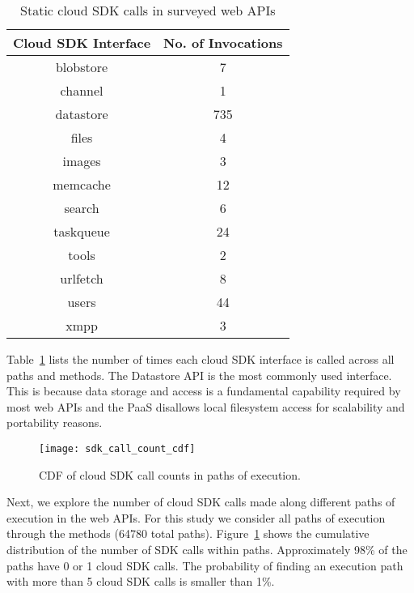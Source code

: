\begin{table}[htdp]
\caption{Static cloud SDK calls in surveyed web APIs
\label{tab:sdk_call_counts}
}
\begin{center}
\begin{tabular}{|c|c|}
\hline
Cloud SDK Interface & No. of Invocations \\ \hline
blobstore & 7 \\ \hline
channel & 1 \\ \hline
datastore & 735 \\ \hline
files & 4 \\ \hline
images & 3 \\ \hline
memcache & 12 \\ \hline
search & 6 \\ \hline
taskqueue & 24 \\ \hline
tools & 2 \\ \hline
urlfetch & 8 \\ \hline
users & 44 \\ \hline
xmpp & 3 \\ \hline
\end{tabular}
\end{center}
\vspace{-0.2in}
\end{table}

Table~\ref{tab:sdk_call_counts} lists the number of times each cloud 
SDK interface is called across all paths and methods.
The Datastore API is the most commonly used interface.
This is because data storage and access is a fundamental 
capability required by most web APIs and the PaaS
disallows local filesystem
access for scalability and portability reasons.

\begin{figure}
\centering
\texttt{[image: sdk\_call\_count\_cdf]}
\caption{CDF of cloud SDK call counts in paths of execution.
\label{fig:sdk_call_count_cdf}
}
\vspace{-0.2in}
\end{figure}

Next, we explore the number of cloud SDK calls made along 
different paths of execution in the web APIs. For this study
we consider all paths of execution through the methods (64780 total paths). 
Figure~\ref{fig:sdk_call_count_cdf}
shows the cumulative distribution of the number of SDK calls within paths.
Approximately 98\% of the paths have 0 or 1 cloud SDK calls. 
The probability of finding an execution path with more than
5 cloud SDK calls is smaller than 1\%.

